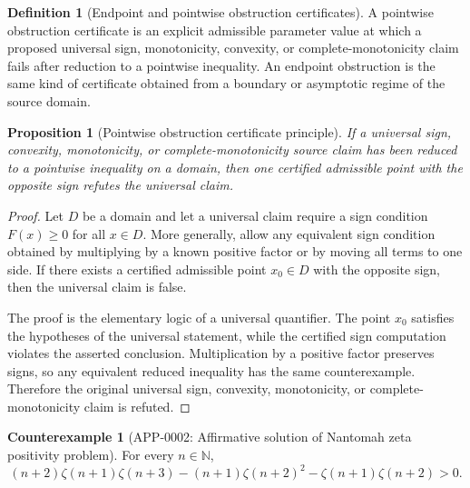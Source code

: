 \documentclass[11pt]{article}
\numberwithin{equation}{section}
\newtheorem{proposition}[theorem]{Proposition}
\theoremstyle{definition}
\newtheorem{definition}{Definition}[section]
\newtheorem{counterexample}[theorem]{Counterexample}
\theoremstyle{remark}
\newcommand{\N}{\mathbb N}
\newcommand{\1}{\mathbf 1}
\begin{document}
\begin{definition}[Endpoint and pointwise obstruction certificates]
\label{res:endpoint-obstruction-certificate-language}
A pointwise obstruction certificate is an explicit admissible parameter value at which a proposed universal sign, monotonicity, convexity, or complete-monotonicity claim fails after reduction to a pointwise inequality. An endpoint obstruction is the same kind of certificate obtained from a boundary or asymptotic regime of the source domain.
\end{definition}

\begin{proposition}[Pointwise obstruction certificate principle]
\label{res:pointwise-obstruction-certificate-principle}
If a universal sign, convexity, monotonicity, or complete-monotonicity source claim has been reduced to a pointwise inequality on a domain, then one certified admissible point with the opposite sign refutes the universal claim.
\end{proposition}

\begin{proof}
Let \(D\) be a domain and let a universal claim require a sign condition \(F(x)\ge0\) for all \(x\in D\). More generally, allow any equivalent sign condition obtained by multiplying by a known positive factor or by moving all terms to one side. If there exists a certified admissible point \(x_0\in D\) with the opposite sign, then the universal claim is false.

The proof is the elementary logic of a universal quantifier. The point \(x_0\) satisfies the hypotheses of the universal statement, while the certified sign computation violates the asserted conclusion. Multiplication by a positive factor preserves signs, so any equivalent reduced inequality has the same counterexample. Therefore the original universal sign, convexity, monotonicity, or complete-monotonicity claim is refuted.
\end{proof}

\begin{counterexample}[APP-0002: Affirmative solution of Nantomah zeta positivity problem]
\label{thm:nantomah-positivity}
For every \(n\in\N\),
\begin{equation}
\label{eq:nantomah-positivity}
(n+2)\zeta(n+1)\zeta(n+3)
-(n+1)\zeta(n+2)^2
-\zeta(n+1)\zeta(n+2)>0.
\end{equation}


\end{counterexample}
\end{document}

